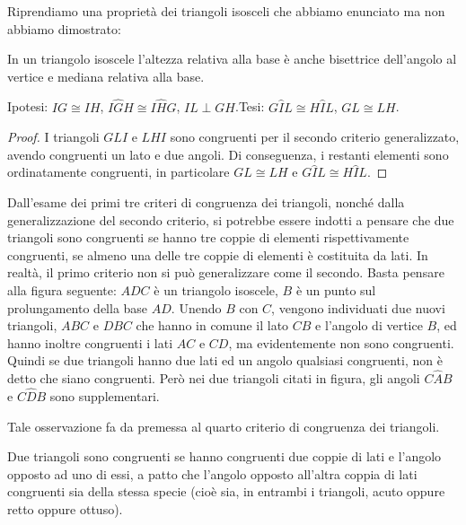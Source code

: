 Riprendiamo una proprietà dei triangoli isosceli che abbiamo enunciato ma non abbiamo dimostrato:
\begin{proposizione}
In un triangolo isoscele l'altezza relativa alla base è anche bisettrice dell'angolo al vertice e mediana relativa alla base.
\end{proposizione}

\noindent Ipotesi: $IG\cong IH$, $I\widehat{G}H\cong I\widehat{H}G$, $IL\perp GH$.\tab Tesi: $G\widehat{I}L\cong H\widehat{I}L$, $GL\cong LH$.

\begin{proof}
I triangoli $GLI$ e $LHI$ sono congruenti per il secondo criterio generalizzato, avendo congruenti un lato e due angoli. Di conseguenza, i restanti elementi sono ordinatamente congruenti, in particolare $GL\cong LH$ e $G\widehat{I}L\cong H\widehat{I}L$.
\end{proof}

\begin{osservazione}
Dall'esame dei primi tre criteri di congruenza dei triangoli, nonché dalla generalizzazione del secondo criterio, si potrebbe essere indotti a pensare che due triangoli sono congruenti se hanno tre coppie di elementi rispettivamente congruenti, se almeno una delle tre coppie di elementi è costituita da lati.
In realtà, il primo criterio non si può generalizzare come il secondo. Basta pensare alla figura seguente: $ADC$ è un triangolo isoscele, $B$ è un punto sul prolungamento della base $AD$. Unendo $B$ con $C$, vengono individuati due nuovi triangoli, $ABC$ e $DBC$ che hanno in comune il lato $CB$ e l'angolo di vertice $B$, ed hanno inoltre congruenti i lati $AC$ e $CD$, ma evidentemente non sono congruenti. Quindi se due triangoli hanno due lati ed un angolo qualsiasi congruenti, non è detto che siano congruenti. Però nei due triangoli citati in figura, gli angoli $C\widehat{A}B$ e $C\widehat{D}B$ sono supplementari.
\end{osservazione}

Tale osservazione fa da premessa al quarto criterio di congruenza dei triangoli.
\begin{teorema}
Due triangoli sono congruenti se hanno congruenti due coppie di lati e l'angolo opposto ad uno di essi, a patto che l'angolo opposto all'altra coppia di lati congruenti sia della stessa specie (cioè sia, in entrambi i triangoli, acuto oppure retto oppure ottuso).
\end{teorema}

